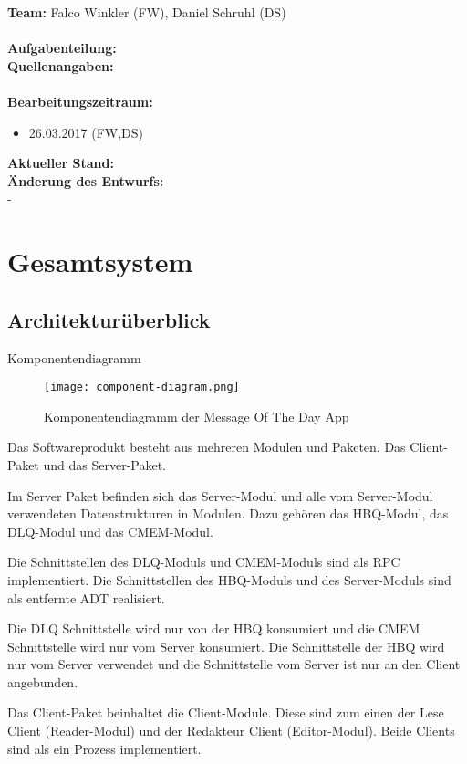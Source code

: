 \documentclass{article}
\begin{document}
\textbf{Team:} Falco Winkler (FW), Daniel Schruhl (DS)\\
\\
\textbf{Aufgabenteilung:}\\

\textbf{Quellenangaben:}\\
\\
\textbf{Bearbeitungszeitraum:}
\begin{itemize}
	\item 26.03.2017 (FW,DS)
\end{itemize}

\textbf{Aktueller Stand:}\\

\textbf{Änderung des Entwurfs:}\\
-
\newpage
\tableofcontents 
\newpage
\section{Gesamtsystem}
	\subsection{Architekturüberblick}
	Komponentendiagramm
	\begin{figure}[H]
	\centering
		\texttt{[image: component-diagram.png]}
	\caption[seq-dia]{Komponentendiagramm der Message Of The Day App}
	\label{fig:component-diagram}
	\end{figure}

	Das Softwareprodukt besteht aus mehreren Modulen und Paketen. Das Client-Paket und das Server-Paket.

	Im Server Paket befinden sich das Server-Modul und alle vom Server-Modul verwendeten Datenstrukturen in Modulen.
	Dazu gehören das HBQ-Modul, das DLQ-Modul und das CMEM-Modul.

	Die Schnittstellen des DLQ-Moduls und CMEM-Moduls sind als RPC implementiert. Die Schnittstellen des HBQ-Moduls und des
	Server-Moduls sind als entfernte ADT realisiert.

	Die DLQ Schnittstelle wird nur von der HBQ konsumiert und die CMEM Schnittstelle wird nur vom Server konsumiert.
	Die Schnittstelle der HBQ wird nur vom Server verwendet und die Schnittstelle vom Server ist nur an den Client angebunden.

	Das Client-Paket beinhaltet die Client-Module. Diese sind zum einen der Lese Client (Reader-Modul) und der Redakteur
	Client (Editor-Modul). Beide Clients sind als ein Prozess implementiert.
	
\end{document}
